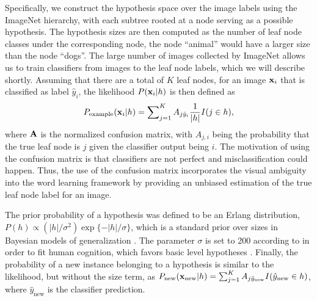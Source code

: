 Specifically, we construct the hypothesis space over the image labels using the ImageNet hierarchy, with each subtree rooted at a node serving as a possible hypothesis. The hypothesis sizes are then computed as the number of leaf node classes under the corresponding node, \eg the node ``animal'' would have a larger size than the node ``dogs''. The large number of images collected by ImageNet allows us to train classifiers from images to the leaf node labels, which we will describe shortly. Assuming that there are a total of $K$ leaf nodes, for an image $\mathbf{x}_i$ that is classified as label $\hat{y}_i$, the likelihood $P(\mathbf{x}_i | h)$ is then defined as
\begin{equation}
    P_{\mathrm{example}}(\mathbf{x}_i | h) = \sum\nolimits_{j=1}^{K}A_{j\hat{y}_i}\frac{1}{|h|}I(j \in h),
\end{equation}
where $\mathbf{A}$ is the normalized confusion matrix, with $A_{j,i}$ being the probability that the true leaf node is $j$ given the classifier output being $i$. The motivation of using the confusion matrix is that classifiers are not perfect and misclassification could happen. Thus, the use of the confusion matrix incorporates the visual ambiguity into the word learning framework by providing an unbiased estimation of the true leaf node label for an image.

The prior probability of a hypothesis was defined to be an Erlang distribution, $P(h)\propto (|h|/\sigma^2)\exp\{-|h|/\sigma\}$, which is a standard prior over sizes in Bayesian models of generalization \cite{shepard87, tenenbaum2000rules}. The parameter $\sigma$ is set to 200 according to \cite{abbott2012} in order to fit human cognition, which favors basic level hypotheses \cite{rosch1976basic}. Finally, the probability of a new instance belonging to a hypothesis is similar to the likelihood, but without the size term, as $P_{\mathrm{new}}(\mathbf{x}_\mathrm{new} | h) = \sum_{j=1}^{K}A_{j\hat{y}_\mathrm{new}}I(\hat{y}_\mathrm{new} \in h)$, where $\hat{y}_\mathrm{new}$ is the classifier prediction.



